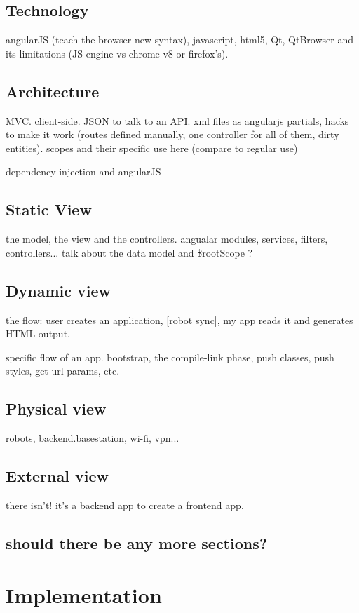 \section{Technology}
angularJS (teach the browser new syntax), javascript, html5, Qt, QtBrowser and its limitations (JS engine vs chrome v8 or firefox's).

\section{Architecture}
MVC. client-side. JSON to talk to an API. xml files as angularjs partials, hacks to make it work (routes defined manually, one controller for all of them, dirty entities). scopes and their specific use here (compare to regular use)

dependency injection and angularJS

\section{Static View}
the model, the view and the controllers. angualar modules, services, filters, controllers...
talk about the data model and \$rootScope ?

\section{Dynamic view}
the flow: user creates an application, [robot sync], my app reads it and generates HTML output.

specific flow of an app. bootstrap, the compile-link phase, push classes, push styles, get url params, etc.

\section{Physical view}
robots, backend.basestation, wi-fi, vpn...

\section{External view}
there isn't! it's a backend app to create a frontend app.

\section{should there be any more sections?}

\chapter{Implementation}
